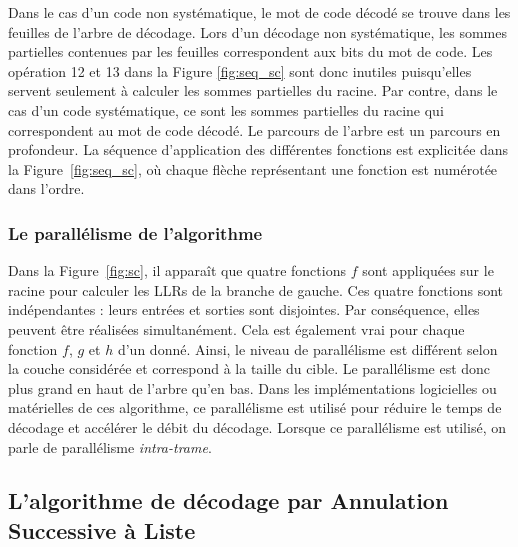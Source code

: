 Dans le cas d'un code non systématique, le mot de code décodé se trouve dans les feuilles de l'arbre de décodage.
Lors d'un décodage non systématique, les sommes partielles contenues par les feuilles correspondent aux bits du mot de code.
Les opération 12 et 13 dans la Figure \ref{fig:seq_sc} sont donc inutiles puisqu'elles servent seulement à calculer les sommes partielles du \noeud racine.
Par contre, dans le cas d'un code systématique, ce sont les sommes partielles du \noeud racine qui correspondent au mot de code décodé.
Le parcours de l'arbre est un parcours en profondeur.
La séquence d'application des différentes fonctions est explicitée dans la Figure~\ref{fig:seq_sc}, où chaque flèche représentant une fonction est numérotée dans l'ordre.



\subsubsection{Le parallélisme de l'algorithme}
Dans la Figure~\ref{fig:sc}, il apparaît que quatre fonctions $f$ sont appliquées sur le \noeud racine pour calculer les LLRs de la branche de gauche. Ces quatre fonctions sont indépendantes : leurs entrées et sorties sont disjointes. Par conséquence, elles peuvent être réalisées simultanément. Cela est également vrai pour chaque fonction $f$, $g$ et $h$ d'un \noeud donné. Ainsi, le niveau de parallélisme est différent selon la couche considérée et correspond à la taille du \noeud cible. Le parallélisme est donc plus grand en haut de l'arbre qu'en bas. Dans les implémentations logicielles ou matérielles de ces algorithme, ce parallélisme est utilisé pour réduire le temps de décodage et accélérer le débit du décodage. Lorsque ce parallélisme est utilisé, on parle de parallélisme \textit{intra-trame}.


\subsection{L'algorithme de décodage par Annulation Successive à Liste}
